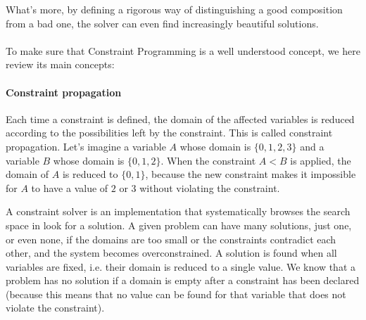 What's more, by defining a rigorous way of distinguishing a good composition from a bad one, the solver can even find increasingly beautiful solutions.
\paragraph{}
To make sure that Constraint Programming is a well understood concept, we here review its main concepts:

\paragraph{Constraint propagation}
Each time a constraint is defined, the domain of the affected variables is reduced according to the possibilities left by the constraint. This is called constraint propagation. Let's imagine a variable $A$ whose domain is $\{0, 1, 2, 3\}$ and a variable $B$ whose domain is $\{0, 1, 2\}$. When the constraint $A<B$ is applied, the domain of $A$ is reduced to $\{0, 1\}$, because the new constraint makes it impossible for $A$ to have a value of $2$ or $3$ without violating the constraint.

A constraint solver is an implementation that systematically browses the search space in look for a solution. A given problem can have many solutions, just one, or even none, if the domains are too small or the constraints contradict each other, and the system becomes overconstrained.
A solution is found when all variables are fixed, i.e. their domain is reduced to a single value. We know that a problem has no solution if a domain is empty after a constraint has been declared (because this means that no value can be found for that variable that does not violate the constraint).

